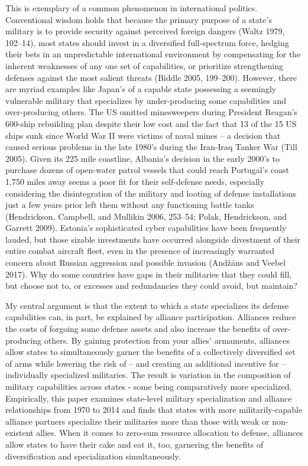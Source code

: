\documentclass[
  12,
  letterpaper,
  DIV=11,
  numbers=noendperiod]{scrartcl}
\begin{document}
This is exemplary of a common phenomenon in international politics.
Conventional wisdom holds that because the primary purpose of a state's
military is to provide security against perceived foreign dangers (Waltz
1979, 102--14), most states should invest in a diversified full-spectrum
force, hedging their bets in an unpredictable international environment
by compensating for the inherent weaknesses of any one set of
capabilities, or prioritize strengthening defenses against the most
salient threats (Biddle 2005, 199--200). However, there are myriad
examples like Japan's of a capable state possessing a seemingly
vulnerable military that specializes by under-producing some
capabilities and over-producing others. The US omitted minesweepers
during President Reagan's 600-ship rebuilding plan despite their low
cost and the fact that 13 of the 15 US ships sunk since World War II
were victims of naval mines -- a decision that caused serious problems
in the late 1980's during the Iran-Iraq Tanker War (Till 2005). Given
its 225 mile coastline, Albania's decision in the early 2000's to
purchase dozens of open-water patrol vessels that could reach Portugal's
coast 1,750 miles away seems a poor fit for their self-defense needs,
especially considering the disintegration of the military and looting of
defense installations just a few years prior left them without any
functioning battle tanks (Hendrickson, Campbell, and Mullikin 2006,
253--54; Polak, Hendrickson, and Garrett 2009). Estonia's sophisticated
cyber capabilities have been frequently lauded, but those sizable
investments have occurred alongside divestment of their entire combat
aircraft fleet, even in the presence of increasingly warranted concern
about Russian aggression and possible invasion (Andžāns and Veebel
2017). Why do some countries have gaps in their militaries that they
could fill, but choose not to, or excesses and redundancies they could
avoid, but maintain?

My central argument is that the extent to which a state specializes its
defense capabilities can, in part, be explained by alliance
participation. Alliances reduce the costs of forgoing some defense
assets and also increase the benefits of over-producing others. By
gaining protection from your allies' armaments, alliances allow states
to simultaneously garner the benefits of a collectively diversified set
of arms while lowering the risk of -- and creating an additional
incentive for -- individually specialized militaries. The result is
variation in the composition of military capabilities across states -
some being comparatively more specialized. Empirically, this paper
examines state-level military specialization and alliance relationships
from 1970 to 2014 and finds that states with more militarily-capable
alliance partners specialize their militaries more than those with weak
or non-existent allies. When it comes to zero-sum resource allocation to
defense, alliances allow states to have their cake and eat it, too,
garnering the benefits of diversification and specialization
simultaneously.
\end{document}
